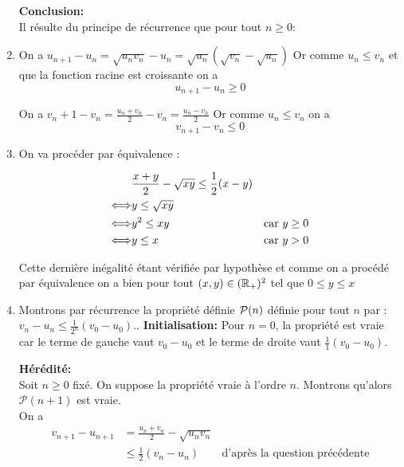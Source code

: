 \documentclass[a4paper, 11pt]{article}
\begin{document}
\begin{correction}
\begin{enumerate}
\textbf{Conclusion:}\\
Il r\'esulte du principe de r\'ecurrence que pour tout $ n\geq 0$:
\begin{center}
\end{center}

\item 
On a $u_{n+1}-u_n = \sqrt{u_nv_n}-u_n = \sqrt{u_n}( \sqrt{v_n} -\sqrt{u_n})$
Or comme $u_n\leq v_n$ et que la fonction racine est croissante on a 
$$u_{n+1}-u_n \geq 0$$


On a $v_n+1-v_n= \frac{u_n+v_n}{2} - v_n  = \frac{u_n-v_n}{2}$
Or comme $u_n\leq v_n$ on a 
$$v_{n+1}-v_n\leq 0$$

\item 

On va procéder par équivalence : 

\begin{align*}
    &\frac{x+y}{2}-\sqrt{xy}\leq \frac{1}{2}(x-y)\\
    \Longleftrightarrow &y \leq \sqrt{xy}\\
    \Longleftrightarrow & y^2 \leq xy & \text{car $y\geq 0$}\\
    \Longleftrightarrow & y \leq x & \text{car $y> 0$}\\
\end{align*}

Cette dernière inégalité étant vérifiée par hypothèse  et comme on a procédé par équivalence on a bien 
pour tout $(x,y)\in (\mathbb{R}_+)^2$  tel que $0\leq y\leq x$

 



\item 
Montrons par récurrence la propriété définie $\mathcal{P}(n)$ définie pour tout $n$ par : \og $  v_n-u_n\leq \frac{1}{2^n}(v_0-u_0).$\fg. 
\textbf{Initialisation:}  Pour $n=0$, la propriété est vraie car le terme de gauche vaut $v_0-u_0$ et le terme de droite vaut $\frac{1}{1}(v_0-u_0)$. 

 \textbf{H\'er\'edit\'e:}\\
Soit $n\geq 0$ fix\'e. On suppose la propri\'et\'e vraie \`a l'ordre $n$. Montrons qu'alors $\mathcal{P}(n+1)$ est vraie.\\
On  a 
\begin{align*}
v_{n+1}-u_{n+1} &= \frac{u_n +v_n}{2} - \sqrt{u_n v_n} \\
			     &\leq \frac{1}{2} (v_n-u_n) & \text{d'après la question précédente}
														

\end{align*}
\end{enumerate}
\end{correction}
\end{document}
